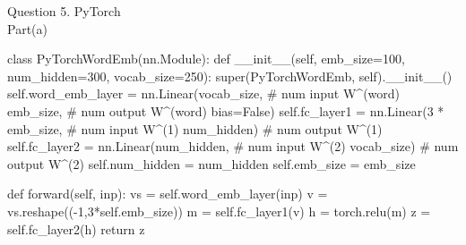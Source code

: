 \documentclass[12pt]{article}
\begin{document}
Question 5. PyTorch\\

Part(a)\\
\begin{python}
class PyTorchWordEmb(nn.Module):
    def __init__(self, emb_size=100, num_hidden=300, vocab_size=250):
        super(PyTorchWordEmb, self).__init__()
        self.word_emb_layer = nn.Linear(vocab_size,      # num input W^(word)
                        emb_size,      # num output W^(word)
                                        bias=False)
        self.fc_layer1 = nn.Linear(3 * emb_size, # num input W^(1)
                                   num_hidden) # num output W^(1)
        self.fc_layer2 = nn.Linear(num_hidden, # num input W^(2)
                                   vocab_size) # num output W^(2)
        self.num_hidden = num_hidden
        self.emb_size = emb_size

    def forward(self, inp):
        vs = self.word_emb_layer(inp)
        v = vs.reshape((-1,3*self.emb_size)) 
        m = self.fc_layer1(v)
        h = torch.relu(m)
        z = self.fc_layer2(h) 
        return z
\end{python}
\end{document}
